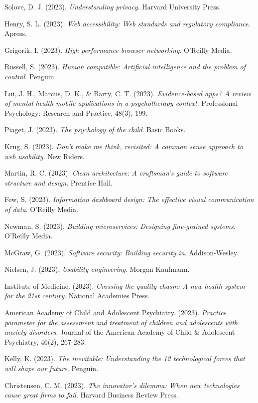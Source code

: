 ﻿\documentclass[12pt,a4paper]{article}
\begin{document}
\begin{thebibliography}{99}
Solove, D. J. (2023). \textit{Understanding privacy}. Harvard University Press.

Henry, S. L. (2023). \textit{Web accessibility: Web standards and regulatory compliance}. Apress.

Grigorik, I. (2023). \textit{High performance browser networking}. O'Reilly Media.

Russell, S. (2023). \textit{Human compatible: Artificial intelligence and the problem of control}. Penguin.

Lui, J. H., Marcus, D. K., \& Barry, C. T. (2023). \textit{Evidence-based apps? A review of mental health mobile applications in a psychotherapy context}. Professional Psychology: Research and Practice, 48(3), 199.

Piaget, J. (2023). \textit{The psychology of the child}. Basic Books.

Krug, S. (2023). \textit{Don't make me think, revisited: A common sense approach to web usability}. New Riders.

Martin, R. C. (2023). \textit{Clean architecture: A craftsman's guide to software structure and design}. Prentice Hall.

Few, S. (2023). \textit{Information dashboard design: The effective visual communication of data}. O'Reilly Media.

Newman, S. (2023). \textit{Building microservices: Designing fine-grained systems}. O'Reilly Media.

McGraw, G. (2023). \textit{Software security: Building security in}. Addison-Wesley.

Nielsen, J. (2023). \textit{Usability engineering}. Morgan Kaufmann.

Institute of Medicine. (2023). \textit{Crossing the quality chasm: A new health system for the 21st century}. National Academies Press.

American Academy of Child and Adolescent Psychiatry. (2023). \textit{Practice parameter for the assessment and treatment of children and adolescents with anxiety disorders}. Journal of the American Academy of Child \& Adolescent Psychiatry, 46(2), 267-283.

Kelly, K. (2023). \textit{The inevitable: Understanding the 12 technological forces that will shape our future}. Penguin.

Christensen, C. M. (2023). \textit{The innovator's dilemma: When new technologies cause great firms to fail}. Harvard Business Review Press.

\end{thebibliography}
\end{document}
